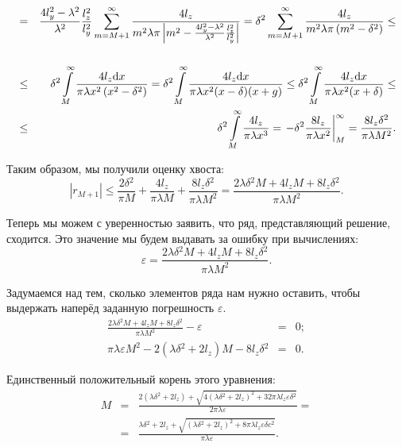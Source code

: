 \begin{eqnarray*}
  \\
  &=& \frac{4l_y^2 - \lambda^2}{\lambda^2} \frac{l_z^2}{l_y^2} \sum \limits_{m=M+1}^{\infty} \frac{4 l_z}{m^2 \lambda \pi \left| m^2 - \frac{4l_y^2 - \lambda^2}{\lambda^2} \frac{l_z^2}{l_y^2} \right|} = \delta{}^2 \sum \limits_{m=M+1}^{\infty} \frac{4 l_z}{m^2 \lambda \pi \left( m^2 - \delta{}^2 \right)} \leq \\
  \\
  &\leq& \delta{}^2 \int \limits_M^{\infty} \frac{4 l_z \mathrm{d} x}{\pi \lambda x^2 \left( x^2 - \delta{}^2 \right)} = 
  \delta{}^2 \int \limits_M^{\infty} \frac{4 l_z \mathrm{d} x}{\pi \lambda x^2 (x - \delta{}) (x + g)} \leq
  \delta{}^2 \int \limits_M^{\infty} \frac{4 l_z \mathrm{d} x}{\pi \lambda x^2 (x + \delta{})} \leq \\
  &\leq& \delta{}^2 \int \limits_M^{\infty} \frac{4 l_z}{\pi \lambda x^3} =
  \left. - \delta{}^2 \frac{8 l_z}{\pi \lambda x^2} \right|_M^{\infty} =
  \frac{8 l_z \delta{}^2}{\pi \lambda M^2}.
\end{eqnarray*}


Таким образом, мы получили оценку хвоста: \\
\[
\left| r_{M+1} \right| \leq \frac{2 \delta{}^2}{\pi M} + \frac{4 l_z}{\pi \lambda M} + \frac{8 l_z \delta{}^2}{\pi \lambda M^2} = \frac{2 \lambda \delta{}^2 M + 4 l_z M + 8 l_z \delta{}^2}{\pi \lambda M^2}.
\]

Теперь мы можем с уверенностью заявить, что ряд, представляющий решение, сходится.
Это значение мы будем выдавать за ошибку при вычислениях:\\
\[
\varepsilon = \frac{2 \lambda \delta{}^2 M + 4 l_z M + 8 l_z \delta{}^2}{\pi \lambda M^2}.
\]

Задумаемся над тем, сколько элементов ряда нам нужно оставить, чтобы выдержать наперёд заданную погрешность $\varepsilon$.
\begin{eqnarray*}
\frac{2 \lambda \delta{}^2 M + 4 l_z M + 8 l_z \delta{}^2}{\pi \lambda M^2} - \varepsilon &=& 0;\\
\pi \lambda \varepsilon M^2 - 2 \left( \lambda \delta{}^2 + 2 l_z \right) M - 8 l_z \delta{}^2 &=& 0.
\end{eqnarray*}

Единственный положительный корень этого уравнения:
\begin{eqnarray*}
  M &=& \frac{2 \left( \lambda \delta{}^2 + 2 l_z \right) + \sqrt{4 \left( \lambda \delta{}^2 + 2 l_z \right)^2 + 32 \pi \lambda l_z \varepsilon \delta{}^2}}{2 \pi \lambda \varepsilon} =\\
  &=&\frac{\lambda \delta{}^2 + 2 l_z + \sqrt{\left( \lambda \delta{}^2 + 2 l_z \right)^2 + 8 \pi \lambda l_z \varepsilon \delta{} c^2}}{\pi \lambda \varepsilon}.
\end{eqnarray*}

